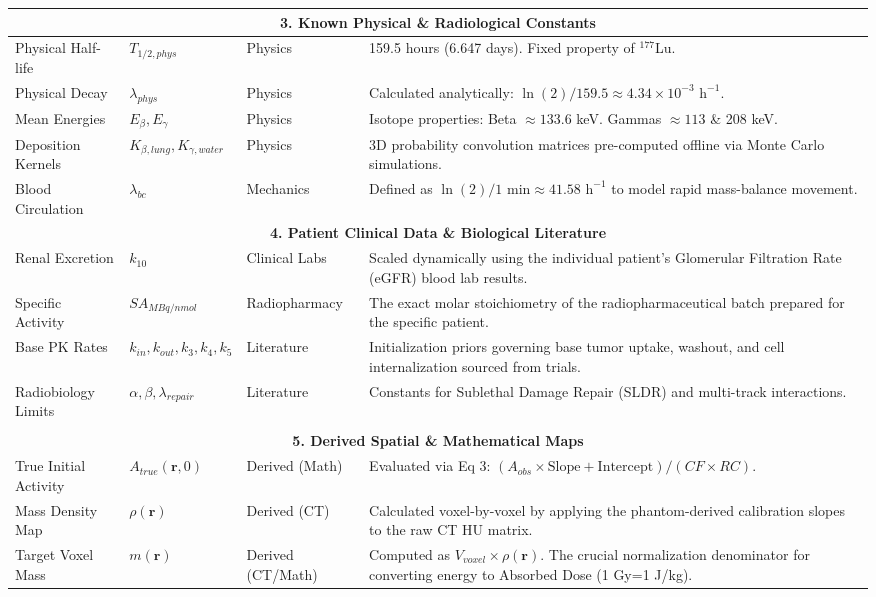 \documentclass[11pt,a4paper]{article}
\begin{document}
\begin{table}[h!]
\begin{tabularx}{\textwidth}{@{}l l l X@{}}
\multicolumn{4}{c}{\textbf{3. Known Physical \& Radiological Constants}} \\ \midrule
Physical Half-life & $T_{1/2, phys}$ & Physics & 159.5 hours (6.647 days). Fixed property of $^{177}$Lu. \\
Physical Decay & $\lambda_{phys}$ & Physics & Calculated analytically: $\ln(2)/159.5 \approx 4.34 \times 10^{-3} \text{ h}^{-1}$. \\
Mean Energies & $E_\beta, E_\gamma$ & Physics & Isotope properties: Beta $\approx 133.6$ keV. Gammas $\approx 113$ \& 208 keV. \\
Deposition Kernels & $K_{\beta, lung}, K_{\gamma, water}$ & Physics & 3D probability convolution matrices pre-computed offline via Monte Carlo simulations. \\
Blood Circulation & $\lambda_{bc}$ & Mechanics & Defined as $\ln(2)/1 \text{ min} \approx 41.58 \text{ h}^{-1}$ to model rapid mass-balance movement. \\ \midrule
\multicolumn{4}{c}{\textbf{4. Patient Clinical Data \& Biological Literature}} \\ \midrule
Renal Excretion & $k_{10}$ & Clinical Labs & Scaled dynamically using the individual patient's Glomerular Filtration Rate (eGFR) blood lab results. \\
Specific Activity & $SA_{MBq/nmol}$ & Radiopharmacy & The exact molar stoichiometry of the radiopharmaceutical batch prepared for the specific patient. \\
Base PK Rates & $k_{in}, k_{out}, k_3, k_4, k_5$ & Literature & Initialization priors governing base tumor uptake, washout, and cell internalization sourced from trials. \\
Radiobiology Limits & $\alpha, \beta, \lambda_{repair}$ & Literature & Constants for Sublethal Damage Repair (SLDR) and multi-track interactions. \\ \\ \midrule
\multicolumn{4}{c}{\textbf{5. Derived Spatial \& Mathematical Maps}} \\ \midrule
True Initial Activity & $A_{true}(\mathbf{r}, 0)$ & Derived (Math) & Evaluated via Eq 3: $(A_{obs} \times \text{Slope} + \text{Intercept}) / (CF \times RC)$. \\
Mass Density Map & $\rho(\mathbf{r})$ & Derived (CT) & Calculated voxel-by-voxel by applying the phantom-derived calibration slopes to the raw CT HU matrix. \\
Target Voxel Mass & $m(\mathbf{r})$ & Derived (CT/Math) & Computed as $V_{voxel} \times \rho(\mathbf{r})$. The crucial normalization denominator for converting energy to Absorbed Dose (1 Gy=1 J/kg). \\

\end{tabularx}
\end{table}
\end{document}
